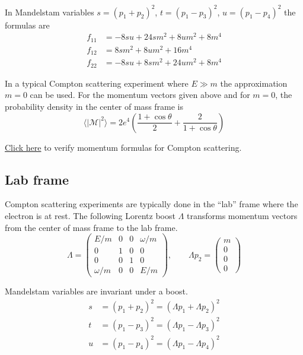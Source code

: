 \documentclass[12pt]{article}
\begin{document}
\noindent
In Mandelstam variables $s=(p_1+p_2)^2$, $t=(p_1-p_3)^2$, $u=(p_1-p_4)^2$ the formulas are
\begin{equation}
\begin{aligned}
f_{11}&=-8 s u + 24 s m^2 + 8 u m^2 + 8 m^4
\\
f_{12}&=8 s m^2 + 8 u m^2 + 16 m^4
\\
f_{22}&=-8 s u + 8 s m^2 + 24 u m^2 + 8 m^4
\end{aligned}
\end{equation}

\noindent
In a typical Compton scattering experiment where $E\gg m$ the approximation $m=0$ can be used.
For the momentum vectors given above and for $m=0$, the probability density in the
center of mass frame is
\begin{equation*}
\langle|\mathcal{M}|^2\rangle
=
2e^4\left(
\frac{1+\cos\theta}{2}+\frac{2}{1+\cos\theta}
\right)
\end{equation*}

\noindent
\href{https://georgeweigt.github.io/compton-scattering-2.html}{Click here}
to verify momentum formulas for Compton scattering.

\subsection*{Lab frame}

Compton scattering experiments are typically done in the ``lab'' frame where the electron is at rest.
The following Lorentz boost $\Lambda$ transforms momentum vectors from
the center of mass frame to the lab frame.
\begin{equation*}
\Lambda=
\begin{pmatrix}
E/m & 0 & 0 & \omega/m\\
0 & 1 & 0 & 0\\
0 & 0 & 1 & 0\\
\omega/m & 0 & 0 & E/m
\end{pmatrix},
\qquad
\Lambda p_2=\begin{pmatrix}m \\ 0 \\ 0 \\ 0\end{pmatrix}
\end{equation*}

\noindent
Mandelstam variables are invariant under a boost.
\begin{equation*}
\begin{aligned}
s&=(p_1+p_2)^2=(\Lambda p_1+\Lambda p_2)^2
\\
t&=(p_1-p_3)^2=(\Lambda p_1-\Lambda p_3)^2
\\
u&=(p_1-p_4)^2=(\Lambda p_1-\Lambda p_4)^2
\end{aligned}
\end{equation*}
\end{document}
